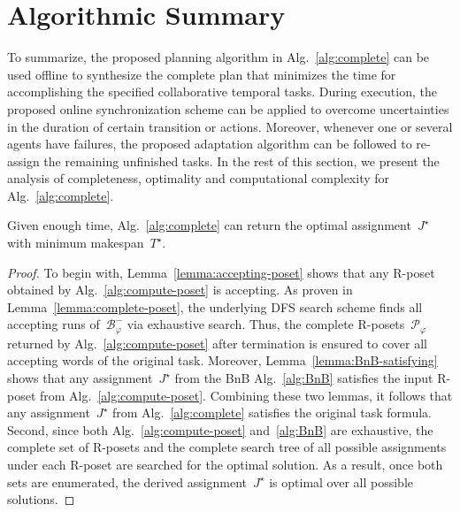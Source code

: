 \section{Algorithmic Summary}\label{subsec:summary}

To summarize, the proposed planning algorithm in Alg.~\ref{alg:complete}
can be used offline to synthesize the complete plan that
minimizes the time for accomplishing the specified collaborative temporal tasks.
During execution, the proposed online synchronization scheme can be applied to
overcome uncertainties in the duration of certain transition or actions.
Moreover, whenever one or several agents have failures, the proposed adaptation
algorithm can be followed to re-assign the remaining unfinished tasks.
In the rest of this section,
we present the analysis of completeness, optimality and computational
complexity for Alg.~\ref{alg:complete}.

\begin{theorem}[Completeness]\label{theo:completeness}
Given enough time, Alg.~\ref{alg:complete} can return the optimal
assignment~$J^\star$ with minimum makespan~$T^\star$.
\end{theorem}
\begin{proof}
 To begin with, Lemma~\ref{lemma:accepting-poset} shows that any R-poset obtained
 by Alg.~\ref{alg:compute-poset} is accepting.
 As proven in Lemma~\ref{lemma:complete-poset},
 the underlying DFS search scheme finds all accepting runs of~$\mathcal{B}^-_{\varphi}$ via exhaustive search.
 Thus, the complete R-posets~$\mathcal{P}_{\varphi}$ returned by
 Alg.~\ref{alg:compute-poset} after termination is ensured to cover all
 accepting words of the original task.
 Moreover, Lemma~\ref{lemma:BnB-satisfying} shows that any assignment~$J^\star$
 from the BnB Alg.~\ref{alg:BnB} satisfies the input R-poset
 from Alg.~\ref{alg:compute-poset}.
 Combining these two lemmas, it follows that any assignment~$J^\star$
 from Alg.~\ref{alg:complete} satisfies the original task formula.
 Second, since both Alg.~\ref{alg:compute-poset} and~\ref{alg:BnB} are exhaustive,
 the complete set of R-posets and the complete search tree of all
 possible assignments under each R-poset are searched for the optimal solution.
 As a result, once both sets are enumerated, the derived assignment~$J^\star$ is
 optimal over all possible solutions.
\end{proof}

